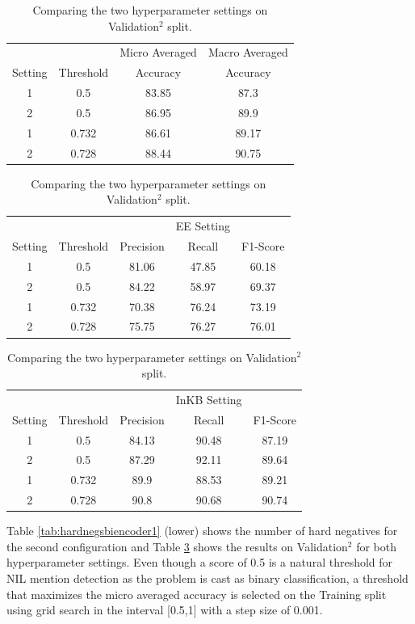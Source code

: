 \documentclass{report}
\theoremstyle{definition}
\theoremstyle{remark}
\begin{document}
\begin{table}
    \centering
    \begin{tabular}{cccc}
    &&Micro Averaged & Macro Averaged\\
    Setting & Threshold     & Accuracy &Accuracy \\
    \hline
    1  & 0.5&83.85&87.3\\
    2  & 0.5&86.95&89.9\\
    1  & 0.732&86.61&89.17\\
    2  & 0.728&88.44&90.75\\
    \end{tabular}
    
    \vspace{0.5cm}\begin{tabular}{ccccc}
    &&&EE Setting & \\
    Setting    & Threshold & Precision & Recall & F1-Score \\
    \hline
    1  & 0.5&81.06	&47.85&	60.18\\
    2  & 0.5&84.22&	58.97&	69.37\\
    1  & 0.732&70.38&	76.24&	73.19\\
    2  & 0.728&75.75&	76.27&	76.01\\
    \end{tabular}
    
    \vspace{0.5cm}\begin{tabular}{ccccc}
    &&&InKB Setting & \\
    Setting    & Threshold& Precision & Recall & F1-Score \\
    \hline
    1  & 0.5&84.13&	90.48&	87.19\\
    2  & 0.5&87.29&	92.11&	89.64\\
    1  & 0.732&89.9&	88.53&	89.21\\
    2  &0.728&90.8&	90.68&	90.74\\
    \end{tabular}
    \caption{Comparing the two hyperparameter settings on Validation$^2$ split.}
    \label{tab:biencoderadaptres}
\end{table}

Table \ref{tab:hardnegsbiencoder1} (lower) shows the number of hard negatives for the second configuration and Table \ref{tab:biencoderadaptres} shows the results on Validation$^2$ for both hyperparameter settings. Even though a score of 0.5 is a natural threshold for NIL mention detection as the problem is cast as binary classification, a threshold that maximizes the micro averaged accuracy is selected on the Training split using grid search in the interval [0.5,1] with a step size of 0.001. 
\end{document}
